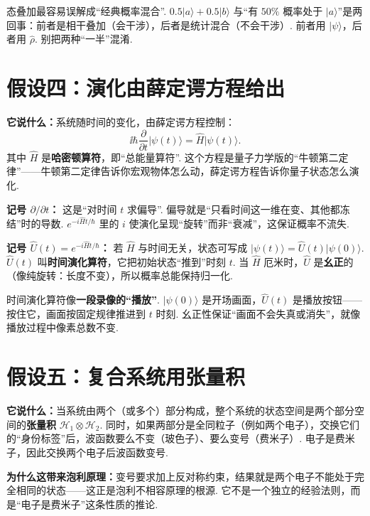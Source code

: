 \documentclass[UTF8,11pt,a4paper,openany]{ctexbook}
\newcommand{\ket}[1]{\lvert #1\rangle}\newcommand{\bra}[1]{\langle #1\rvert}
\newcommand{\term}[1]{\textbf{#1}}
\begin{document}
\begin{limitbox}
态叠加最容易误解成“经典概率混合”. $0.5\ket a+0.5\ket b$ 与“有 $50\%$ 概率处于 $\ket a$”是两回事：前者是相干叠加（会干涉），后者是统计混合（不会干涉）. 前者用 $\ket\psi$，后者用 $\hat\rho$. 别把两种“一半”混淆. 
\end{limitbox}
\section{假设四：演化由薛定谔方程给出}
\textbf{它说什么：}系统随时间的变化，由薛定谔方程控制：
\[
\ii\hbar\frac{\partial}{\partial t}\ket{\psi(t)}=\hat H\ket{\psi(t)}.
\]
其中 $\hat H$ 是\term{哈密顿算符}，即“总能量算符”. 这个方程是量子力学版的“牛顿第二定律”——牛顿第二定律告诉你宏观物体怎么动，薛定谔方程告诉你量子状态怎么演化. 

\begin{notationbox}
\textbf{记号 $\partial/\partial t$：} 这是“对时间 $t$ 求偏导”. 偏导就是“只看时间这一维在变、其他都冻结”时的导数. $e^{-i\hat Ht/\hbar}$ 里的 $i$ 使演化呈现“旋转”而非“衰减”，这保证概率不流失. 
\end{notationbox}

\textbf{记号 $\hat U(t)=e^{-i\hat Ht/\hbar}$：} 若 $\hat H$ 与时间无关，状态可写成 $\ket{\psi(t)}=\hat U(t)\ket{\psi(0)}$. $\hat U(t)$ 叫\term{时间演化算符}，它把初始状态“推到”时刻 $t$. 当 $\hat H$ 厄米时，$\hat U$ 是\term{幺正}的（像纯旋转：长度不变），所以概率总能保持归一化. 

\begin{analogybox}
时间演化算符像\textbf{一段录像的“播放”}. $\ket{\psi(0)}$ 是开场画面，$\hat U(t)$ 是播放按钮——按住它，画面按固定规律推进到 $t$ 时刻. 幺正性保证“画面不会失真或消失”，就像播放过程中像素总数不变. 
\end{analogybox}

\section{假设五：复合系统用张量积}
\textbf{它说什么：}当系统由两个（或多个）部分构成，整个系统的状态空间是两个部分空间的\term{张量积} $\mathcal H_1\otimes\mathcal H_2$. 同时，如果两部分是全同粒子（例如两个电子），交换它们的“身份标签”后，波函数要么不变（玻色子）、要么变号（费米子）. 电子是费米子，因此交换两个电子后波函数变号. 

\textbf{为什么这带来泡利原理：}变号要求加上反对称约束，结果就是两个电子不能处于完全相同的状态——这正是泡利不相容原理的根源. 它不是一个独立的经验法则，而是“电子是费米子”这条性质的推论. 
\end{document}
